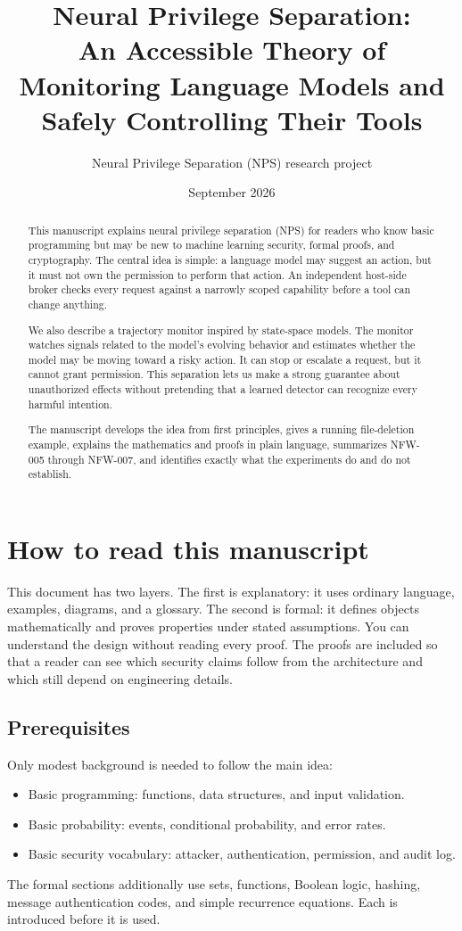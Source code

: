 \documentclass[11pt]{article}
\title{\textbf{Neural Privilege Separation:}\\
An Accessible Theory of Monitoring Language Models and Safely Controlling Their Tools}
\author{Neural Privilege Separation (NPS) research project}
\date{September 2026}
\begin{document}
\maketitle

\begin{abstract}
This manuscript explains neural privilege separation (NPS) for readers who know basic programming but may be new to machine learning security, formal proofs, and cryptography. The central idea is simple: a language model may suggest an action, but it must not own the permission to perform that action. An independent host-side broker checks every request against a narrowly scoped capability before a tool can change anything.

We also describe a trajectory monitor inspired by state-space models. The monitor watches signals related to the model's evolving behavior and estimates whether the model may be moving toward a risky action. It can stop or escalate a request, but it cannot grant permission. This separation lets us make a strong guarantee about unauthorized effects without pretending that a learned detector can recognize every harmful intention.

The manuscript develops the idea from first principles, gives a running file-deletion example, explains the mathematics and proofs in plain language, summarizes NFW-005 through NFW-007, and identifies exactly what the experiments do and do not establish.
\end{abstract}

\tableofcontents

\section{How to read this manuscript}

This document has two layers. The first is explanatory: it uses ordinary language, examples, diagrams, and a glossary. The second is formal: it defines objects mathematically and proves properties under stated assumptions. You can understand the design without reading every proof. The proofs are included so that a reader can see which security claims follow from the architecture and which still depend on engineering details.

\subsection{Prerequisites}
Only modest background is needed to follow the main idea:
\begin{itemize}
  \item Basic programming: functions, data structures, and input validation.
  \item Basic probability: events, conditional probability, and error rates.
  \item Basic security vocabulary: attacker, authentication, permission, and audit log.
\end{itemize}
The formal sections additionally use sets, functions, Boolean logic, hashing, message authentication codes, and simple recurrence equations. Each is introduced before it is used.
\end{document}
